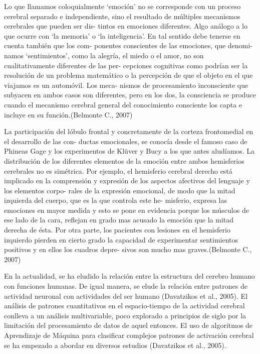 Lo que llamamos coloquialmente ‘emoción’ no se corresponde con un proceso cerebral separado   e   independiente,   sino   el   resultado   de múltiples  mecanismos  cerebrales  que  pueden  ser  dis- tintos en emociones diferentes. Algo análogo a lo que ocurre  con  ‘la  memoria’ o  ‘la  inteligencia’.  En  tal sentido  debe  tenerse  en  cuenta  también  que  los  com- ponentes  conscientes  de  las  emociones,  que  denomi- namos  ‘sentimientos’,  como  la  alegría,  el  miedo  o  el amor,  no  son  cualitativamente  diferentes  de  las  per- cepciones  cognitivas  como  podrían  ser  la  resolución de un problema matemático o la percepción de que el objeto en el que viajamos es un automóvil. Los meca- nismos  de  procesamiento  inconsciente  que  subyacen en  ambos  casos  son  diferentes,  pero  en  los  dos,  la consciencia se produce cuando el mecanismo cerebral general  del  conocimiento  consciente  los  capta  e incluye en su función.(Belmonte C., 2007)

La participación del lóbulo frontal y concretamente de la corteza frontomedial en el desarrollo de las con- ductas  emocionales,  se  conocía  desde  el  famoso  caso de Phineas Gage y los experimentos de Klüver y Bucy a los que antes aludíamos. La  distribución  de  los  diferentes  elementos  de  la emoción  entre  ambos  hemisferios  cerebrales  no  es simétrica. Por ejemplo, el hemisferio cerebral derecho está  implicado  en  la  comprensión  y  expresión  de  los aspectos afectivos del lenguaje y los elementos corpo- rales de la expresión emocional, de modo que la mitad izquierda  del  cuerpo,  que  es  la  que  controla  este  he- misferio,  expresa  las  emociones  en  mayor  medida  y esto se pone en evidencia porque los músculos de ese lado  de  la  cara,  reflejan  en  grado  mas  acusado  la emoción que la mitad derecha de ésta. Por otra parte, los  pacientes  con  lesiones  en  el  hemisferio  izquierdo pierden  en  cierto  grado  la  capacidad  de  experimentar sentimientos  positivos  y  en  ellos  los  cuadros  depre- sivos son mucho mas graves.(Belmonte C., 2007)

En la actualidad, se ha eludido la relación entre la estructura del cerebro humano con funciones humanas. De igual manera, se elude la relación entre patrones de actividad neuronal con actividades del ser humano (Davatzikos et al., 2005). El análisis de patrones cuantitativos en el espacio-tiempo de la actividad cerebral conlleva a un análisis multivariable, poco explorado a principios de siglo por la limitación del procesamiento de datos de aquel entonces. El uso de algoritmos de Aprendizaje de Máquina para clasificar complejos patrones de activación cerebral se ha empezado a abordar en diversos estudios (Davatzikos et al., 2005).

